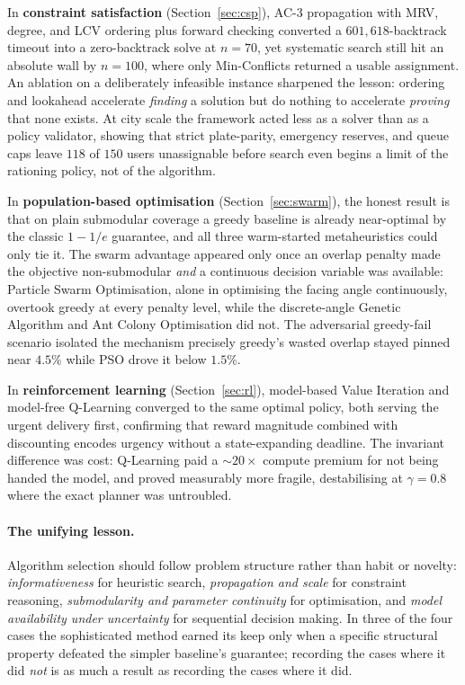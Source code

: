 \documentclass{ai-lab-report}
\begin{document}
In \textbf{constraint satisfaction} (Section~\ref{sec:csp}), AC-3
propagation with MRV, degree, and LCV ordering plus forward
checking converted a $601{,}618$-backtrack timeout into a
zero-backtrack solve at $n = 70$, yet systematic search still hit
an absolute wall by $n = 100$, where only Min-Conflicts returned a
usable assignment. An ablation on a deliberately infeasible
instance sharpened the lesson: ordering and lookahead accelerate
\emph{finding} a solution but do nothing to accelerate
\emph{proving} that none exists. At city scale the framework acted
less as a solver than as a policy validator, showing that strict
plate-parity, emergency reserves, and queue caps leave $118$ of
$150$ users unassignable before search even begins  a limit of the
rationing policy, not of the algorithm.

In \textbf{population-based optimisation}
(Section~\ref{sec:swarm}), the honest result is that on plain
submodular coverage a greedy baseline is already near-optimal by
the classic $1 - 1/e$ guarantee, and all three warm-started
metaheuristics could only tie it. The swarm advantage appeared only
once an overlap penalty made the objective non-submodular
\emph{and} a continuous decision variable was available: Particle
Swarm Optimisation, alone in optimising the facing angle
continuously, overtook greedy at every penalty level, while the
discrete-angle Genetic Algorithm and Ant Colony Optimisation did
not. The adversarial greedy-fail scenario isolated the mechanism
precisely  greedy's wasted overlap stayed pinned near $4.5\%$
while PSO drove it below $1.5\%$.

In \textbf{reinforcement learning} (Section~\ref{sec:rl}),
model-based Value Iteration and model-free Q-Learning converged to
the same optimal policy, both serving the urgent delivery first,
confirming that reward magnitude combined with discounting encodes
urgency without a state-expanding deadline. The invariant
difference was cost: Q-Learning paid a ${\sim}20\times$ compute
premium for not being handed the model, and proved measurably more
fragile, destabilising at $\gamma = 0.8$ where the exact planner
was untroubled.

\paragraph{The unifying lesson.} Algorithm selection should follow
problem structure rather than habit or novelty:
\emph{informativeness} for heuristic search, \emph{propagation and
scale} for constraint reasoning, \emph{submodularity and parameter
continuity} for optimisation, and \emph{model availability under
uncertainty} for sequential decision making. In three of the four
cases the sophisticated method earned its keep only when a specific
structural property defeated the simpler baseline's guarantee;
recording the cases where it did \emph{not} is as much a result as
recording the cases where it did.
\end{document}
